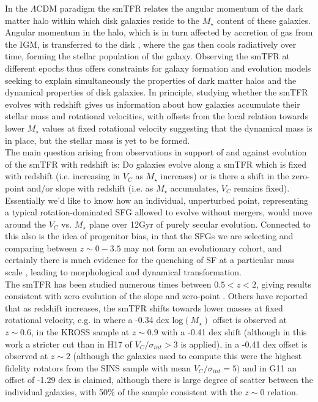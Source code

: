\documentclass[fleqn,usenatbib]{mn2e}
\begin{document}
In the $\Lambda$CDM paradigm the smTFR relates the angular momentum of the dark matter halo within which disk galaxies reside to the $M_{\star}$ content of these galaxies.
Angular momentum in the halo, which is in turn affected by accretion of gas from the IGM, is transferred to the disk \citep{Fall1983}, where the gas then cools radiatively over time, forming the stellar population of the galaxy.
Observing the smTFR at different epochs thus offers constraints for galaxy formation and evolution models seeking to explain simultaneously the properties of dark matter halos and the dynamical properties of disk galaxies.
In principle, studying whether the smTFR evolves with redshift gives us information about how galaxies accumulate their stellar mass and rotational velocities, with offsets from the local relation towards lower $M_{\star}$ values at fixed rotational velocity suggesting that the dynamical mass is in place, but the stellar mass is yet to be formed. \\

The main question arising from observations in support of and against evolution of the smTFR with redshift is: Do galaxies evolve along a smTFR which is fixed with redshift (i.e. increasing in $V_{C}$ as $M_{\star}$ increases) or is there a shift in the zero-point and/or slope with redshift (i.e. as $M_{\star}$ accumulates, $V_{C}$ remains fixed).
Essentially we'd like to know how an individual, unperturbed point, representing a typical rotation-dominated SFG allowed to evolve without mergers, would move around the $V_{C}$ vs. $M_{\star}$ plane over 12Gyr of purely secular evolution.
Connected to this also is the idea of progenitor bias, in that the SFGs we are selecting and comparing between $z\sim0-3.5$ may not form an evolutionary cohort, and certainly there is much evidence for the quenching of SF at a particular mass scale \citep[e.g.][]{Keres2005,Dekel2006,Peng2010}, leading to morphological and dynamical transformation. \\

The smTFR has been studied numerous times between $0.5 < z < 2$, giving results consistent with zero evolution of the slope and zero-point \citep[e.g.][]{Flores2006,Miller2011,Kassin2012,Miller2012,Vergani2012,Miller2014,Contini2015a,Molina2016,Pelliccia2016,DiTeodoro2016,Harrison2017}.
Others have reported that as redshift increases, the smTFR shifts towards lower masses at fixed rotational velocity, e.g. in \cite{Puech2008,Puech2010} where a -0.34 dex log$(M_{\star})$ offset is observed at $z\sim0.6$, in the \cite{Tiley2016a} KROSS sample at $z\sim0.9$ with a -0.41 dex shift (although in this work a stricter cut than in H17 of $V_{C}/\sigma_{int} > 3$ is applied), in \cite{Cresci2009} a -0.41 dex offset is observed at $z\sim2$ (although the galaxies used to compute this were the highest fidelity rotators from the SINS sample with mean $V_{C}/\sigma_{int} = 5)$ and in G11 an offset of -1.29 dex is claimed, although there is large degree of scatter between the individual galaxies, with 50\% of the sample consistent with the $z\sim0$ relation. \\
\end{document}
